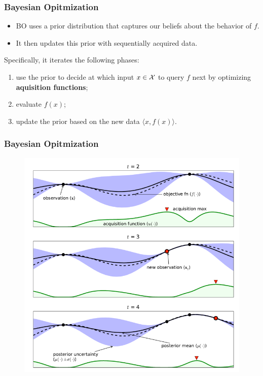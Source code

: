 \documentclass[grey]{beamer}
\begin{document}
\begin{frame}
 \frametitle{Bayesian Opitmization}
 \begin{itemize}
  \item BO uses a prior distribution 
  that captures our beliefs about the behavior of $f$.
  \item It then updates this prior with sequentially acquired data.
 \end{itemize}

 Specifically, it iterates the following phases:
 \begin{enumerate}
  \item use the prior to decide at which input $x\in \cal X$ to query $f$ next
  by optimizing {\bf \textcolor{myColor}{aquisition functions}};
  \item evaluate $f(x)$;
  \item update the prior based on the new data $\langle{}x, f(x)\rangle$.
 \end{enumerate}
\end{frame}

 \begin{frame}
 \frametitle{Bayesian Opitmization}
  \begin{figure}
   \centering
   \includegraphics[width=0.75\columnwidth]
   {./figs/bo}
   \label{fig:traj}
  \end{figure}
 \end{frame}
\end{document}
